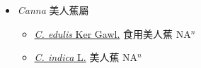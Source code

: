 
  \begin{itemize}
 \item[] \textit{Canna} 美人蕉屬
                    
  \begin{itemize}
        \item[] \href{http://www.theplantlist.org/tpl1.1/search?q=Canna+edulis}{\textit{C. edulis} Ker Gawl.}   食用美人蕉 NA$^n$
        \item[] \href{http://www.theplantlist.org/tpl1.1/search?q=Canna+indica}{\textit{C. indica} L.}   美人蕉 NA$^n$
  \end{itemize}
  \end{itemize}
